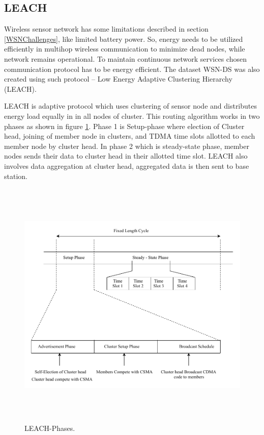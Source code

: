     \subsection{LEACH} \label{SSLeach}
    Wireless sensor network has some limitations described in section \ref{WSNChallenges}, like limited battery power. So, energy needs to be utilized efficiently in multihop wireless communication to minimize dead nodes, while network remains operational. To maintain continuous network services chosen communication protocol has to be energy efficient. The dataset WSN-DS was also created using such protocol – Low Energy Adaptive Clustering Hierarchy (LEACH). 
    \par LEACH \cite{palan2017low} is adaptive protocol which uses clustering of sensor node and distributes energy load equally in in all nodes of cluster. This routing algorithm works in two phases as shown in figure \ref{LeachPhases}. Phase 1 is Setup-phase where election of Cluster head, joining of member node in clusters, and TDMA time slots allotted to each member node by cluster head. In phase 2 which is steady-state phase, member nodes sends their data to cluster head in their allotted time slot. LEACH also involves data aggregation at cluster head, aggregated data is then sent to base station.
    \begin{figure}[h]
    \center	
    \includegraphics[width=5.5in, height=4.75in] {Figures/PDF/LeachPhases.pdf}
    \caption{LEACH-Phases.}
    \label{LeachPhases}	
    \end{figure}
    \\
